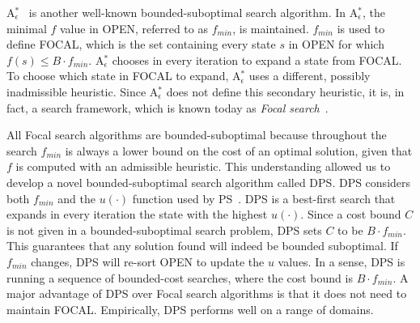 \documentclass{article}
\newcommand{\open}{\textsc{OPEN}\xspace}
\newcommand{\focal}{\textsc{FOCAL}\xspace}
\newcommand{\ees}{\ac{EES}\xspace}
\newcommand{\dps}{\ac{DPS}\xspace}
\newcommand{\ps}{\ac{PS}\xspace}
\newcommand{\wastar}{wA$^*$\xspace}
\newcommand{\astarepsilon}{A$^*_\epsilon$\xspace}
\begin{document}
\astarepsilon~\cite{PearlKimSAH1982} is another well-known bounded-suboptimal search algorithm. In \astarepsilon, the minimal $f$ value in \open, referred to as $f_{min}$, is maintained. 
$f_{min}$ is used to define \focal, which is the set containing every state $s$ in \open  for which $f(s)\leq B\cdot f_{min}$. 
\astarepsilon chooses in every iteration to expand a state from \focal. To choose which state in \focal to expand, \astarepsilon uses a different, possibly  inadmissible heuristic. Since \astarepsilon does not define this secondary heuristic, it is, in fact, a search framework, which is known today as \emph{Focal search}~\cite{ThayerR11BoundedSuboptimalSearch,EbendtD09}. 





All Focal search algorithms are bounded-suboptimal because throughout the search $f_{min}$ is always a lower bound on the cost of an optimal solution, given that $f$ is computed with an admissible heuristic. This understanding allowed us to develop a novel bounded-suboptimal search algorithm called \dps. \dps considers both $f_{min}$ and the $u(\cdot)$ function used by \ps~\cite{GILON2016}. \dps is a best-first search that expands in every iteration the state with the highest $u(\cdot)$. Since a cost bound $C$ is not given in a bounded-suboptimal search problem, \dps sets $C$ to be $B\cdot f_{min}$. This guarantees that any solution found will indeed be bounded suboptimal. 
If $f_{min}$ changes, \dps will re-sort \open to update the $u$ values. 
In a sense, \dps is running a sequence of bounded-cost searches, where the cost bound is $B\cdot f_{min}$. A major advantage of \dps over Focal search algorithms is that it does not need to maintain \focal. Empirically, \dps performs well on a range of domains.
\end{document}
